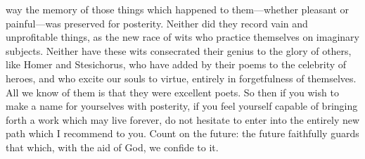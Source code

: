\documentclass[12pt]{article}
\begin{document}
way the memory of those things which happened to them---whether pleasant or
painful---was preserved for posterity. Neither did they record vain and
unprofitable things, as the new race of wits who practice themselves on
imaginary subjects. Neither have these wits consecrated their genius to the
glory of others, like Homer and Stesichorus, who have added by their poems to
the celebrity of heroes, and who excite our souls to virtue, entirely in
forgetfulness of themselves. All we know of them is that they were excellent
poets. So then if you wish to make a name for yourselves with posterity, if you
feel yourself capable of bringing forth a work which may live forever, do not
hesitate to enter into the entirely new path which I recommend to you. Count on
the future: the future faithfully guards that which, with the aid of God, we
confide to it.
\end{document}
